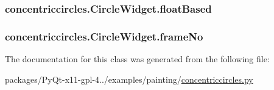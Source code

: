 \subsubsection[{float\+Based}]{\setlength{\rightskip}{0pt plus 5cm}concentriccircles.\+Circle\+Widget.\+float\+Based}\label{classconcentriccircles_1_1CircleWidget_a0eb245e6c43820b9b1d6fab933112ad5}
\hypertarget{classconcentriccircles_1_1CircleWidget_ad7f75ace4c1c56de87bf39055d09038e}{}
\subsubsection[{frame\+No}]{\setlength{\rightskip}{0pt plus 5cm}concentriccircles.\+Circle\+Widget.\+frame\+No}\label{classconcentriccircles_1_1CircleWidget_ad7f75ace4c1c56de87bf39055d09038e}


The documentation for this class was generated from the following file\+:\begin{DoxyCompactItemize}
\item 
packages/\+Py\+Qt-\/x11-\/gpl-\/4../examples/painting/\hyperlink{concentriccircles_8py}{concentriccircles.\+py}\end{DoxyCompactItemize}
